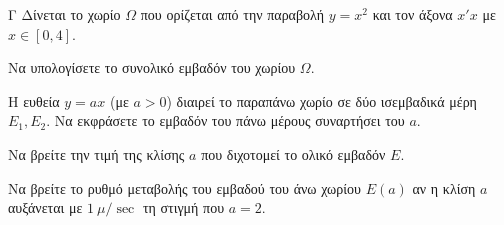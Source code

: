 \begin{thema}{Γ}
Δίνεται το χωρίο $\Omega$ που ορίζεται από την παραβολή $y = x^2$ και τον άξονα $x'x$ με $x \in [0, 4]$.
\begin{erwthma}
  \item Να υπολογίσετε το συνολικό εμβαδόν του χωρίου $\Omega$.
  \item Η ευθεία $y = a x$ (με $a > 0$) διαιρεί το παραπάνω χωρίο σε δύο ισεμβαδικά μέρη $E_1, E_2$. Να εκφράσετε το εμβαδόν του πάνω μέρους συναρτήσει του $a$.
  \item Να βρείτε την τιμή της κλίσης $a$ που διχοτομεί το ολικό εμβαδόν $E$. 
  \item Να βρείτε το ρυθμό μεταβολής του εμβαδού του άνω χωρίου $E(a)$ αν η κλίση $a$ αυξάνεται με $1\ \mu/\sec$ τη στιγμή που $a=2$.
\end{erwthma}
\end{thema}
